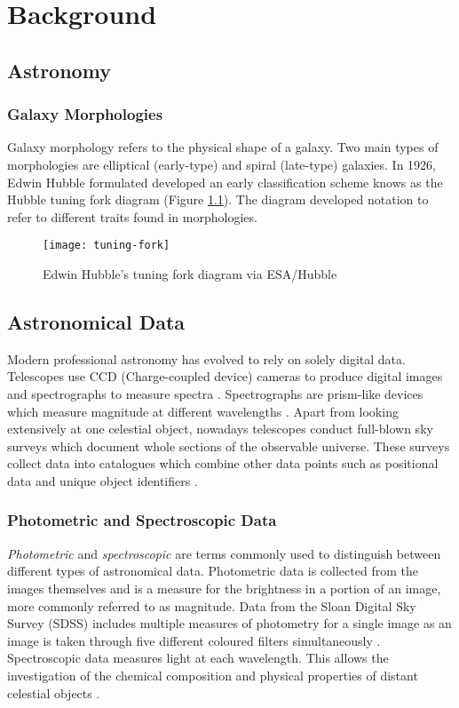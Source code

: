 
\chapter{Background}

\section{Astronomy}

\subsection{Galaxy Morphologies}
Galaxy morphology refers to the physical shape of a galaxy.
Two main types of morphologies are elliptical (early-type) and spiral (late-type) galaxies.
In 1926, Edwin Hubble formulated developed an early classification scheme knows as the Hubble tuning fork diagram (Figure \ref{fig:tuning-fork}).
The diagram developed notation to refer to different traits found in morphologies.

\begin{figure}
    \centering
    \texttt{[image: tuning-fork]}
    \caption[Hubble tuning fork diagram]{Edwin Hubble's tuning fork diagram via ESA/Hubble}
    \label{fig:tuning-fork}
\end{figure}

\section{Astronomical Data}
Modern professional astronomy has evolved to rely on solely digital data.
Telescopes use CCD (Charge-coupled device) cameras to produce digital images and spectrographs to measure spectra \citep{possel_beginners_2020}.
Spectrographs are prism-like devices which measure magnitude at different wavelengths \citep{noauthor_sdss_nodate}.
Apart from looking extensively at one celestial object, nowadays telescopes conduct full-blown sky surveys which document whole sections of the observable universe.
These surveys collect data into catalogues which combine other data points such as positional data and unique object identifiers \citep{possel_beginners_2020}.


\subsection{Photometric and Spectroscopic Data}
\textit{Photometric} and \textit{spectroscopic} are terms commonly used to distinguish between different types of astronomical data.
Photometric data is collected from the images themselves and is a measure for the brightness in a portion of an image, more commonly referred to as magnitude.
Data from the Sloan Digital Sky Survey (SDSS) includes multiple measures of photometry for a single image as an image is taken through five different coloured filters simultaneously \citep{noauthor_voyages_nodate}.
Spectroscopic data measures light at each wavelength. 
This allows the investigation of the chemical composition and physical properties of distant celestial objects \citep{i_appenzeller_immo_author_introduction_2013}.


